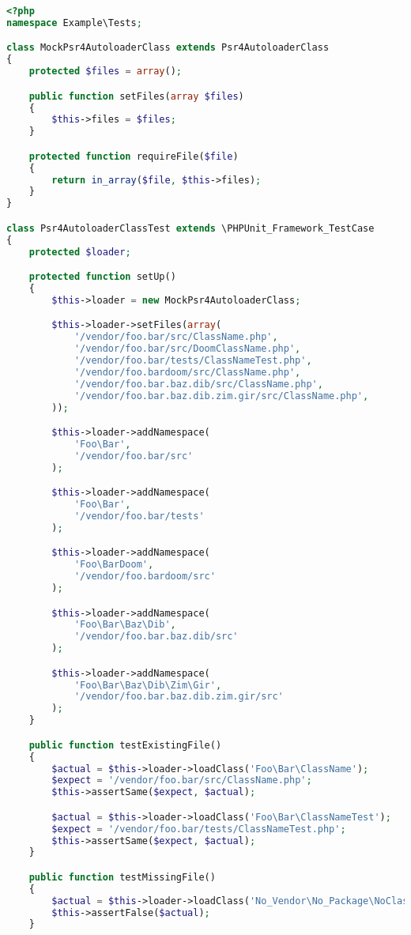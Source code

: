 \begin{lstlisting}[language=PHP]
<?php
namespace Example\Tests;

class MockPsr4AutoloaderClass extends Psr4AutoloaderClass
{
    protected $files = array();

    public function setFiles(array $files)
    {
        $this->files = $files;
    }

    protected function requireFile($file)
    {
        return in_array($file, $this->files);
    }
}

class Psr4AutoloaderClassTest extends \PHPUnit_Framework_TestCase
{
    protected $loader;

    protected function setUp()
    {
        $this->loader = new MockPsr4AutoloaderClass;

        $this->loader->setFiles(array(
            '/vendor/foo.bar/src/ClassName.php',
            '/vendor/foo.bar/src/DoomClassName.php',
            '/vendor/foo.bar/tests/ClassNameTest.php',
            '/vendor/foo.bardoom/src/ClassName.php',
            '/vendor/foo.bar.baz.dib/src/ClassName.php',
            '/vendor/foo.bar.baz.dib.zim.gir/src/ClassName.php',
        ));

        $this->loader->addNamespace(
            'Foo\Bar',
            '/vendor/foo.bar/src'
        );

        $this->loader->addNamespace(
            'Foo\Bar',
            '/vendor/foo.bar/tests'
        );

        $this->loader->addNamespace(
            'Foo\BarDoom',
            '/vendor/foo.bardoom/src'
        );

        $this->loader->addNamespace(
            'Foo\Bar\Baz\Dib',
            '/vendor/foo.bar.baz.dib/src'
        );

        $this->loader->addNamespace(
            'Foo\Bar\Baz\Dib\Zim\Gir',
            '/vendor/foo.bar.baz.dib.zim.gir/src'
        );
    }

    public function testExistingFile()
    {
        $actual = $this->loader->loadClass('Foo\Bar\ClassName');
        $expect = '/vendor/foo.bar/src/ClassName.php';
        $this->assertSame($expect, $actual);

        $actual = $this->loader->loadClass('Foo\Bar\ClassNameTest');
        $expect = '/vendor/foo.bar/tests/ClassNameTest.php';
        $this->assertSame($expect, $actual);
    }

    public function testMissingFile()
    {
        $actual = $this->loader->loadClass('No_Vendor\No_Package\NoClass');
        $this->assertFalse($actual);
    }


\end{lstlisting}
